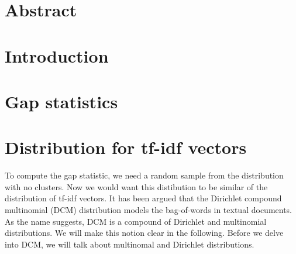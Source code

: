 \documentclass[10pt]{article}
\begin{document}
\newcommand{\cl}[1]{{\hat{#1}}}

\newcommand{\onto}{\twoheadrightarrow}
\newcommand{\gen}[1]{[#1]}
\newcommand{\R}{{\operatorname{R}}}
\newcommand{\lra}{\longrightarrow}

\newcommand {\aand}{\qquad\text{and}\qquad}
\newcommand {\comment}[1]{\footnote{#1}}
\newcommand {\<}{\langle}
\renewcommand {\>}{\rangle}
\newcommand {\Omit}[1]{}
\newcommand {\IP}{\mathbb{P}}
\newcommand{\isom}{\cong}
\newcommand{\half}{\frac{1}{2}}
\newcommand{\tensor}{\otimes}
\renewcommand{\dag}{*}
\newcommand{\fb}{\mathfrak{b}}
\newcommand{\e}{\operatorname{e}}

\newcommand{\Zt}{{\mathbb{Z}_2}}
\newcommand{\Ho}{\operatorname{Ho}}
\renewcommand{\P}{\mathcal{P}}
\newcommand{\Z}{\mathbb{Z}}
\newcommand{\red}{\operatorname{red}}
\newcommand{\n}{\mathfrak{n}}
\newcommand{\blank}{\kern.0mm\smash{-}\kern.0mm}
\newcommand{\blob}{{\scriptscriptstyle\bullet}}
\newcommand{\B}{\mathcal{B}}
\newcommand{\K}{K}
\newcommand{\into}{\hookrightarrow}
\newcommand{\longinto}{\lhook\joinrel\longrightarrow}
\newcommand{\rad}{\operatorname{rad}}
\newcommand{\lRa}[1]{\stackrel{#1}{\lra}}

\newcommand{\tw}{\operatorname{tw}}
\newcommand{\Htw}{\H_{\tw}}
\renewcommand{\DH}{\operatorname{\mathcal{DH}}}
\newcommand{\DHred}{\operatorname{\mathcal{DH}_{red}}}
\newcommand{\U}{\operatorname{U}}
\newcommand{\im}{\operatorname{im}}
\newcommand{\coker}{\operatorname{coker}}
\newcommand{\Iso}{\operatorname{Iso}}



\tableofcontents


	\section*{Abstract} 
	\section{Introduction}
	\section{Gap statistics}
	\section{Distribution for tf-idf vectors}
	To compute the gap statistic, we need a random sample from the distribution with no clusters. Now we would want this distibution to be similar of the distribution of tf-idf vectors. It has been argued\cite{MKE} that the Dirichlet compound multinomial (DCM) distribution models the bag-of-words in textual documents. As the name suggests, DCM is a compound of Dirichlet and multinomial distributions. We will make this notion clear in the following. Before we delve into DCM, we will talk about multinomal and Dirichlet distributions. 
\end{document}
